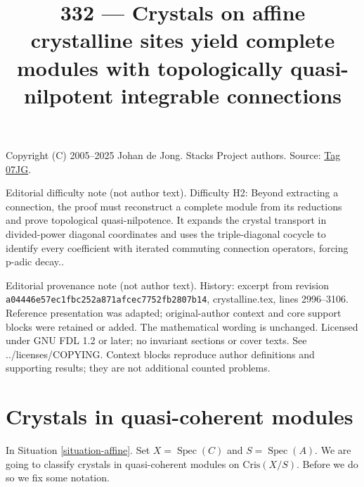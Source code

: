 \documentclass{amsart}
\theoremstyle{plain}
\theoremstyle{definition}
\theoremstyle{remark}
\numberwithin{equation}{subsection}
\def\Spec{\mathop{\mathrm{Spec}}}
\begin{document}
\title[Stacks Project, Tag 07JG]{332 --- Crystals on affine crystalline sites yield complete modules with topologically quasi-nilpotent integrable connections}
\maketitle
\noindent Copyright (C) 2005--2025 Johan de Jong. Stacks Project authors. Source: \href{https://stacks.math.columbia.edu/tag/07JG}{Tag 07JG}.

\noindent Editorial difficulty note (not author text). Difficulty H2: Beyond extracting a connection, the proof must reconstruct a complete module from its reductions and prove topological quasi-nilpotence. It expands the crystal transport in divided-power diagonal coordinates and uses the triple-diagonal cocycle to identify every coefficient with iterated commuting connection operators, forcing p-adic decay..

\noindent Editorial provenance note (not author text). History: excerpt from revision \texttt{a0444\allowbreak 6e57e\allowbreak c1fbc\allowbreak 252a8\allowbreak 71afc\allowbreak ec775\allowbreak 2fb28\allowbreak 07b14}, crystalline.tex, lines 2996--3106. Reference presentation was adapted; original-author context and core support blocks were retained or added. The mathematical wording is unchanged. Licensed under GNU FDL 1.2 or later; no invariant sections or cover texts. See ../licenses/COPYING. Context blocks reproduce author definitions and supporting results; they are not additional counted problems.

\section{Crystals in quasi-coherent modules}
\label{section-quasi-coherent-crystals}

\noindent
In Situation \ref{situation-affine}.
Set $X = \Spec(C)$ and $S = \Spec(A)$. We are going to
classify crystals in quasi-coherent modules on $\text{Cris}(X/S)$.
Before we do so we fix some notation.
\end{document}
